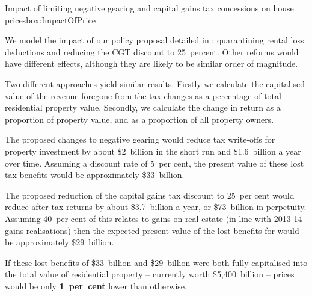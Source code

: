 {\begin{lultrabox}{Impact of limiting negative gearing and capital gains \newline tax concessions on house prices}{box:ImpactOfPrice}

We model the impact of our policy proposal detailed in : quarantining rental loss deductions and reducing the CGT discount to 25~percent. Other reforms would have different effects, although they are likely to be similar order of magnitude.

Two different approaches yield similar results. Firstly we calculate the capitalised value of the revenue foregone from the tax changes as a percentage of total residential property value. Secondly, we calculate the change in return as a proportion of property value, and as a proportion of all property owners.



The proposed changes to negative gearing would reduce tax write-offs for property investment by about \$2~billion in the short run and \$1.6~billion a year over time. Assuming a discount rate of 
5~per cent, the present value of these lost tax benefits would be approximately \$33~billion.


The proposed reduction of the capital gains tax discount to 25~per cent would reduce after tax returns by about \$3.7~billion a year, or \$73~billion in perpetuity. Assuming 40~per cent of this relates to gains on real estate (in line with 2013-14 gains realisations) then the expected present value of the lost benefits for would be approximately \$29~billion.



If these lost benefits of \$33~billion and \$29~billion were both fully capitalised into the total value of residential property -- currently worth \$5,400~billion -- prices would be only \textbf{1~per~cent} lower than otherwise.


\end{lultrabox}}

